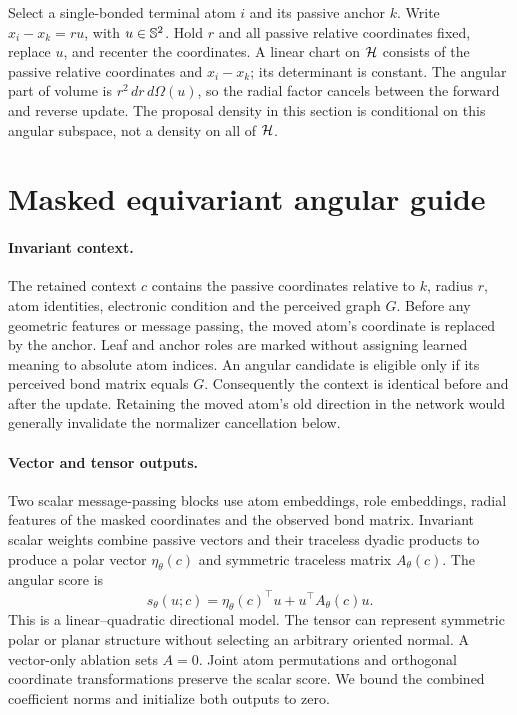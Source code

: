 Select a single-bonded terminal atom $i$ and its passive anchor $k$.
Write $x_i-x_k=r u$, with $u\in\mathbb S^2$. Hold $r$ and all passive relative
coordinates fixed, replace $u$, and recenter the coordinates. A linear chart on
$\mathcal H$ consists of the passive relative coordinates and $x_i-x_k$; its determinant
is constant. The angular part of volume is $r^2\,dr\,d\Omega(u)$, so the radial
factor cancels between the forward and reverse update. The proposal density in
this section is conditional on this angular subspace, not a density on all of $\mathcal H$.

\section{Masked equivariant angular guide}
\paragraph{Invariant context.}
The retained context $c$ contains the passive coordinates relative to $k$, radius
$r$, atom identities, electronic condition and the perceived graph $G$. Before
any geometric features or message passing, the moved atom's coordinate is replaced
by the anchor. Leaf and anchor roles are marked without assigning learned meaning
to absolute atom indices. An angular candidate is eligible only if its perceived
bond matrix equals $G$. Consequently the context is identical before and after
the update. Retaining the moved atom's old direction in the network would generally
invalidate the normalizer cancellation below.

\paragraph{Vector and tensor outputs.}
Two scalar message-passing blocks use atom embeddings, role embeddings, radial
features of the masked coordinates and the observed bond matrix. Invariant scalar
weights combine passive vectors and their traceless dyadic products to produce
a polar vector $\eta_\theta(c)$ and symmetric traceless matrix $A_\theta(c)$.
The angular score is
\begin{equation}
 s_\theta(u;c)=\eta_\theta(c)^\top u+u^\top A_\theta(c)u.
 \label{eq:angular-score}
\end{equation}
This is a linear--quadratic directional model. The tensor can represent symmetric
polar or planar structure without selecting an arbitrary oriented normal. A
vector-only ablation sets $A=0$. Joint atom permutations and orthogonal coordinate
transformations preserve the scalar score. We bound the combined coefficient norms
and initialize both outputs to zero.

